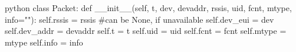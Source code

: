 \begin{mintedbox}{python}
class Packet:
	def __init__(self, t, dev, devaddr, rssis, uid, fcnt, mtype, info=""):
		self.rssis = rssis  #can be None, if unavailable
		self.dev_eui = dev
		self.dev_addr = devaddr
		self.t = t
		self.uid = uid
		self.fcnt = fcnt
		self.mtype = mtype
		self.info = info
\end{mintedbox}
